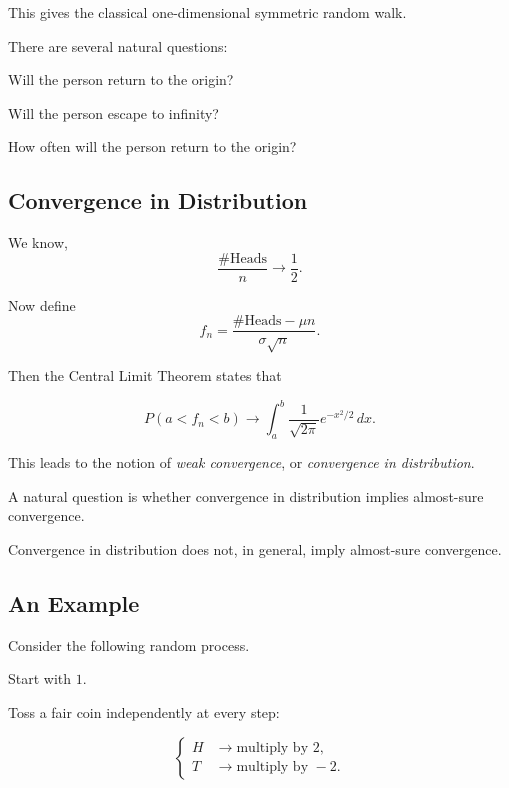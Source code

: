 This gives the classical one-dimensional symmetric random walk.

There are several natural questions:

\begin{questions}

    \item Will the person return to the origin?

    \item Will the person escape to infinity?

    \item How often will the person return to the origin?

\end{questions}


\subsection{Convergence in Distribution}

We know, 
\[
\frac{\#\text{Heads}}{n}
\longrightarrow
\frac12.
\]

Now define
\[
f_n
=
\frac{\#\text{Heads}-\mu n}
{\sigma\sqrt{n}}.
\]

Then the Central Limit Theorem states that

\[
P(a<f_n<b)
\longrightarrow
\int_a^b
\frac{1}{\sqrt{2\pi}}
e^{-x^2/2}\,dx.
\]

This leads to the notion of \emph{weak convergence}, or
\emph{convergence in distribution}.

A natural question is whether convergence in distribution implies
almost-sure convergence.

\begin{important}
Convergence in distribution does not, in general, imply almost-sure
convergence.
\end{important}

\subsection{An Example}

Consider the following random process.

Start with $1$.

Toss a fair coin independently at every step:


\[
\begin{cases}
H &\longrightarrow \text{multiply by }2,\\
T &\longrightarrow \text{multiply by }-2.
\end{cases}
\]

